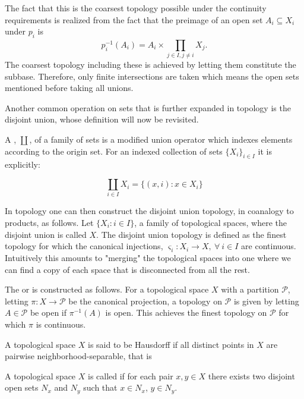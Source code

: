 \documentclass[../../main.tex]{subfiles}
\begin{document}
    The fact that this is the coarsest topology possible under the continuity requirements is realized from the fact that the preimage of an open set $A_i \subseteq X_i$ under $p_i$ is \[p_i^{-1}(A_i) = A_i \times \prod_{j \in I, j \ne i}^{}X_j.\] The coarsest topology including these is achieved by letting them constitute the subbase. Therefore, only finite intersections are taken which means the open sets mentioned before taking all unions.
    
    Another common operation on sets that is further expanded in topology is the disjoint union, whose definition will now be revisited. 

    \begin{definition}
        A , $\coprod$, of a family of sets is a modified union operator which indexes elements according to the origin set. For an indexed collection of sets $\{X_i\}_{i \in I}$ it is explicitly:

        \begin{equation*}
            \coprod_{i \in I} X_i = \{(x, i): x \in X_i\}
        \end{equation*}
    \end{definition}
    
    In topology one can then construct the disjoint union topology, in coanalogy to products, as follows. Let $\{X_i : i \in I\}$, a family of topological spaces, where the disjoint union is called $X$. The disjoint union topology is defined as the finest topology for which the canonical injections, $\varsigma_i :X_i\to X, \: \forall\: i \in I$ are continuous. Intuitively this amounts to "merging" the topological spaces into one where we can find a copy of each space that is disconnected from all the rest.
    
    The  or  is constructed as follows. For a topological space $X$ with a partition $\mathcal{P}$, letting $\pi:X \to \mathcal{P}$ be the canonical projection, a topology on $\mathcal{P}$ is given by letting $A \in \mathcal{P}$ be open if $\pi^{-1}(A)$ is open. This achieves the finest topology on $\mathcal{P}$ for which $\pi$ is continuous.
    
    A topological space $X$ is said to be Hausdorff if all distinct points in $X$ are pairwise neighborhood-separable, that is
    
    \begin{definition}
        A topological space $X$ is called  if for each pair $x, y \in X$ there exists two disjoint open sets $N_x$ and $N_y$ such that $x \in N_x$, $y \in N_y$.
    \end{definition}
    
\end{document}
